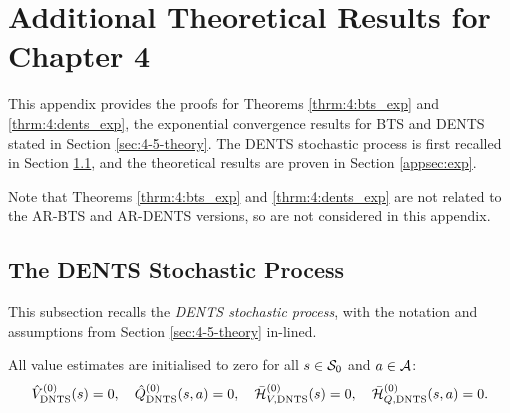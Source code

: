 







\chapter[Additional Theoretical Results for Chapter 4]{\label{app:theory-ch4}Additional Theoretical Results for \\Chapter 4}

    \minitoc

This appendix provides the proofs for Theorems \ref{thrm:4:bts_exp} and \ref{thrm:4:dents_exp}, the exponential convergence results for BTS and DENTS stated in Section \ref{sec:4-5-theory}. The DENTS stochastic process is first recalled in Section \ref{appsec:dents_stoch_process}, and the theoretical results are proven in Section \ref{appsec:exp}.

Note that Theorems \ref{thrm:4:bts_exp} and \ref{thrm:4:dents_exp} are not related to the AR-BTS and AR-DENTS versions, so are not considered in this appendix.



\section{The DENTS Stochastic Process}
\label{appsec:dents_stoch_process}

    This subsection recalls the \textit{DENTS stochastic process}, with the notation and assumptions from Section \ref{sec:4-5-theory} in-lined.
    
    All value estimates are initialised to zero for all $s\in\mathcal{S}_0$ and $a\in\mathcal{A}$:
    \begin{align}
        {\hat{V}^{(0)}_{{\textnormal{DNTS}}}}(s) = 0, \quad {\hat{Q}^{(0)}_{{\textnormal{DNTS}}}}(s,a) = 0, \quad {\bar{\mathcal{H}}^{(0)}_{V,{\textnormal{DNTS}}}}(s) = 0, \quad {\bar{\mathcal{H}}^{(0)}_{Q,{\textnormal{DNTS}}}}(s,a) = 0.
    \end{align}

